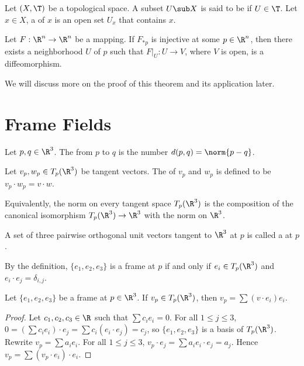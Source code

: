 \documentclass[10pt]{article}
\begin{document}
\begin{definition}
    Let $(X,\T)$ be a topological space. A subset $U\sub X$ is said to be  if $U\in\T$. Let $x\in X$, a  of $x$ is an open set ${U}_{x}$ that contains $x$.
\end{definition}
\begin{theorem}
    Let $F:{\R}^{n}\to{\R}^{n}$ be a mapping. If ${F}_{*p}$ is injective at some $p\in{\R}^{n}$, then there exists a neighborhood $U$ of $p$ such that $F{\vert}_{U}:U\to V$, where $V$ is open, is a diffeomorphism.
\end{theorem}
\par
We will discuss more on the proof of this theorem and its application later.
\section{Frame Fields}
\begin{definition}
    Let $p,q\in{\R}^{3}$. The  from $p$ to $q$ is the number $d(p,q)=\norm{p-q}$.
\end{definition}
\begin{definition}
    Let ${v}_{p},{w}_{p}\in{T}_{p}({\R}^{3})$ be tangent vectors. The  of ${v}_{p}$ and ${w}_{p}$ is defined to be ${v}_{p}\cdot{w}_{p}=v\cdot w$.
\end{definition}
\par
Equivalently, the norm on every tangent space ${T}_{p}({\R}^{3})$ is the composition of the canonical isomorphism ${T}_{p}({\R}^{3})\to{\R}^{3}$ with the norm on ${\R}^{3}$.
\begin{definition}
    A set of three pairwise orthogonal unit vectors tangent to ${\R}^{3}$ at $p$ is called a  at $p$.
\end{definition}
\par
By the definition, $\{{e}_{1},{e}_{2},{e}_{3}\}$ is a frame at $p$ if and only if ${e}_{i}\in{T}_{p}({\R}^{3})$ and ${e}_{i}\cdot{e}_{j}={\delta}_{i,j}$.
\begin{proposition}
    Let $\{{e}_{1},{e}_{2},{e}_{3}\}$ be a frame at $p\in{\R}^{3}$. If ${v}_{p}\in{T}_{p}({\R}^{3})$, then ${v}_{p}=\sum(v\cdot{e}_{i}){e}_{i}$.
\end{proposition}
\begin{proof}
    Let ${c}_{1},{c}_{2},{c}_{3}\in\R$ such that $\sum{c}_{i}{e}_{i}=0$. For all $1\le j\le 3$, $0=(\sum{c}_{i}{e}_{i})\cdot{e}_{j}=\sum{c}_{i}({e}_{i}\cdot{e}_{j})={c}_{j}$, so $\{{e}_{1},{e}_{2},{e}_{3}\}$ is a basis of ${T}_{p}({\R}^{3})$. Rewrite ${v}_{p}=\sum{a}_{i}{e}_{i}$. For all $1\le j\le 3$, ${v}_{p}\cdot{e}_{j}=\sum{a}_{i}{e}_{i}\cdot{e}_{j}={a}_{j}$. Hence ${v}_{p}=\sum({v}_{p}\cdot{e}_{i})\cdot{e}_{i}$.
\end{proof}
\end{document}
